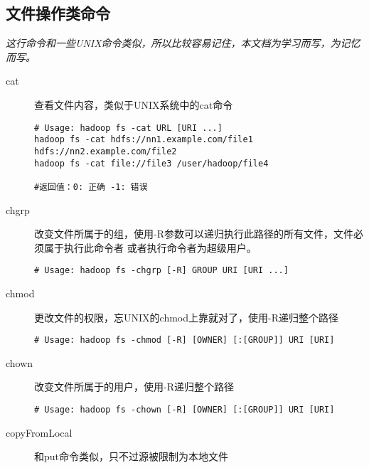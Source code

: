 \documentclass{article}
\begin{document}
\subsection{文件操作类命令}
\textit{
这行命令和一些UNIX命令类似，所以比较容易记住，本文档为学习而写，为记忆而写。
}

\begin{description}
\item[cat] 查看文件内容，类似于UNIX系统中的cat命令

\begin{verbatim}
# Usage: hadoop fs -cat URL [URI ...]
hadoop fs -cat hdfs://nn1.example.com/file1 hdfs://nn2.example.com/file2
hadoop fs -cat file://file3 /user/hadoop/file4

#返回值：0: 正确 -1: 错误
\end{verbatim}


\item[chgrp] 改变文件所属于的组，使用-R参数可以递归执行此路径的所有文件，文件必须属于执行此命令者
或者执行命令者为超级用户。

\begin{verbatim}
# Usage: hadoop fs -chgrp [-R] GROUP URI [URI ...]

\end{verbatim}

\item[chmod] 更改文件的权限，忘UNIX的chmod上靠就对了，使用-R递归整个路径

\begin{verbatim}
# Usage: hadoop fs -chmod [-R] [OWNER] [:[GROUP]] URI [URI]
\end{verbatim}

\item[chown] 改变文件所属于的用户，使用-R递归整个路径

\begin{verbatim}
# Usage: hadoop fs -chown [-R] [OWNER] [:[GROUP]] URI [URI]
\end{verbatim}

\item[copyFromLocal] 和put命令类似，只不过源被限制为本地文件


\end{description}
\end{document}
